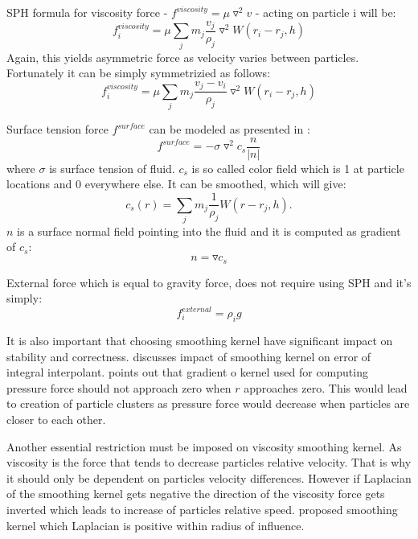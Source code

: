 SPH formula for viscosity force - $f^{viscosity} =  \mu \triangledown^2v$ - acting on particle i will be:
\begin{equation}
\label{eq:sph_viscosity_force}
f^{viscosity}_i = \mu \sum_{j}m_j \frac{v_j}{\rho_j}\triangledown^2 W(r_i - r_j, h) 
\end{equation}
Again, this yields asymmetric force as velocity varies between particles. Fortunately it can be simply symmetrizied as follows:
\begin{equation}
\label{eq:sph_viscosity_force_sym}
f^{viscosity}_i = \mu \sum_{j}m_j \frac{v_j - v_i}{\rho_j}\triangledown^2 W(r_i - r_j, h) 
\end{equation}

Surface tension force $f^{surface}$ can be modeled as presented in \cite{Muller2003}:
\begin{equation}
\label{eq:surface_tension}
f^{surface} = -\sigma \triangledown^2 c_s \frac{n}{|n|}
\end{equation}
where $\sigma$ is surface tension of fluid. $c_s$ is so called color field which is 1 at particle locations and 0 everywhere else. It can be smoothed, which will give:
\begin{equation}
\label{eq:color_field}
c_s(r) = \sum_{j}m_j \frac{1}{\rho_j}W(r-r_j, h).
\end{equation}
$n$ is a surface normal field pointing into the fluid and it is computed as gradient of $c_s$:
\begin{equation}
n = \triangledown c_s
\end{equation}


External force which is equal to gravity force, does not require using SPH and it's simply:
\begin{equation}
f^{external}_i = \rho_i g
\end{equation}

It is also important that choosing smoothing kernel have significant impact on stability and correctness. \cite{Monaghan1992} discusses impact of smoothing kernel on error of integral interpolant. \cite{Muller2003} points out that gradient o kernel used for computing pressure force should not approach zero when $r$ approaches zero. This would lead to creation of particle clusters as pressure force would decrease when particles are closer to each other.

Another essential restriction must be imposed on viscosity smoothing kernel. As viscosity  is the force that tends to decrease particles relative velocity. That is why it should only be dependent on particles velocity differences. However if Laplacian of the smoothing kernel gets negative the direction of the viscosity force gets inverted which leads to increase of particles relative speed. \cite{Muller2003} proposed smoothing kernel which Laplacian is positive within radius of influence. 
